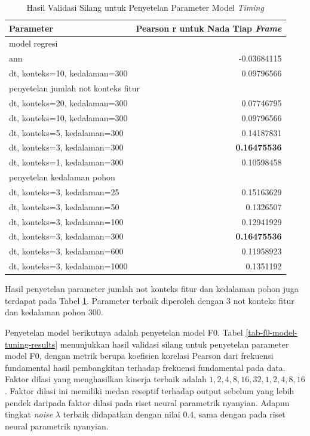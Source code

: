 \begin{table}[htbp]
    \centering
    \caption{Hasil Validasi Silang untuk Penyetelan Parameter Model \textit{Timing}}\label{tab-timing-model-tuning-results}
    \begin{tabular}{ |l|r| } 
     \hline
     Parameter & Pearson r untuk Nada Tiap \textit{Frame} \\
     \hline 
     \multicolumn{2}{|l|}{model regresi}\\ \hline
	 ann    &-0.03684115\\ \hline
	 dt, konteks=10, kedalaman=300     & 0.09796566\\ \hline
	 \multicolumn{2}{|l|}{penyetelan jumlah not konteks fitur}\\ \hline
	 dt, konteks=20, kedalaman=300       &0.07746795\\ \hline
	 dt, konteks=10, kedalaman=300      &0.09796566\\ \hline
	 dt, konteks=5, kedalaman=300     &0.14187831\\ \hline
	 dt, konteks=3, kedalaman=300     &\textbf{0.16475536}\\ \hline
	 dt, konteks=1, kedalaman=300      &0.10598458\\ \hline
	 \multicolumn{2}{|l|}{penyetelan kedalaman pohon}\\ \hline
	 dt, konteks=3, kedalaman=25 	 &0.15163629\\\hline
	 dt, konteks=3, kedalaman=50     &0.1326507\\\hline
	 dt, konteks=3, kedalaman=100      &0.12941929\\\hline
	 dt, konteks=3, kedalaman=300     &\textbf{0.16475536}\\ \hline
	 dt, konteks=3, kedalaman=600     &0.11958923\\\hline
	 dt, konteks=3, kedalaman=1000     &0.1351192   \\  \hline
    \end{tabular}
\end{table}

Hasil penyetelan parameter jumlah not konteks fitur dan kedalaman pohon juga terdapat pada Tabel \ref{tab-timing-model-tuning-results}. Parameter terbaik diperoleh dengan 3 not konteks fitur dan kedalaman pohon 300.

Penyetelan model berikutnya adalah penyetelan model F0. Tabel \ref{tab-f0-model-tuning-results} menunjukkan hasil validasi silang untuk penyetelan parameter model F0, dengan metrik berupa koefisien korelasi Pearson dari frekuensi fundamental hasil pembangkitan terhadap frekuensi fundamental pada data. Faktor dilasi yang menghasilkan kinerja terbaik adalah $1,2,4,8,16,32,1,2,4,8,16$. Faktor dilasi ini memiliki medan reseptif terhadap output sebelum yang lebih pendek daripada faktor dilasi pada riset neural parametrik nyanyian. Adapun tingkat \textit{noise} $\lambda$ terbaik didapatkan dengan nilai $0.4$, sama dengan pada riset neural parametrik nyanyian.

